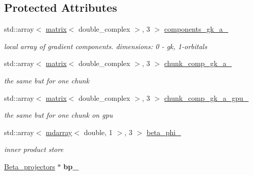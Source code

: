 \subsection*{Protected Attributes}
\begin{DoxyCompactItemize}
\item 
std\+::array$<$ \hyperlink{classsddk_1_1mdarray}{matrix}$<$ double\+\_\+complex $>$, 3 $>$ \hyperlink{classsirius_1_1_beta__projectors__gradient_a619e51c00341dee296a4490b46af4487}{components\+\_\+gk\+\_\+a\+\_\+}
\begin{DoxyCompactList}\small\item\em local array of gradient components. dimensions\+: 0 -\/ gk, 1-\/orbitals \end{DoxyCompactList}\item 
std\+::array$<$ \hyperlink{classsddk_1_1mdarray}{matrix}$<$ double\+\_\+complex $>$, 3 $>$ \hyperlink{classsirius_1_1_beta__projectors__gradient_a6691530f9748af70ddac53d01250536a}{chunk\+\_\+comp\+\_\+gk\+\_\+a\+\_\+}
\begin{DoxyCompactList}\small\item\em the same but for one chunk \end{DoxyCompactList}\item 
std\+::array$<$ \hyperlink{classsddk_1_1mdarray}{matrix}$<$ double\+\_\+complex $>$, 3 $>$ \hyperlink{classsirius_1_1_beta__projectors__gradient_a08693b3d3b23dc8cae58f1a2f1d9b71d}{chunk\+\_\+comp\+\_\+gk\+\_\+a\+\_\+gpu\+\_\+}
\begin{DoxyCompactList}\small\item\em the same but for one chunk on gpu \end{DoxyCompactList}\item 
std\+::array$<$ \hyperlink{classsddk_1_1mdarray}{mdarray}$<$ double, 1 $>$, 3 $>$ \hyperlink{classsirius_1_1_beta__projectors__gradient_ac80b7702e8eee3877608c77b87afa0ac}{beta\+\_\+phi\+\_\+}
\begin{DoxyCompactList}\small\item\em inner product store \end{DoxyCompactList}\item 
\hypertarget{classsirius_1_1_beta__projectors__gradient_acde56492bfb8bd57fc37683f2206a974}{}\hyperlink{classsirius_1_1_beta__projectors}{Beta\+\_\+projectors} $\ast$ {\bfseries bp\+\_\+}\label{classsirius_1_1_beta__projectors__gradient_acde56492bfb8bd57fc37683f2206a974}

\end{DoxyCompactItemize}



